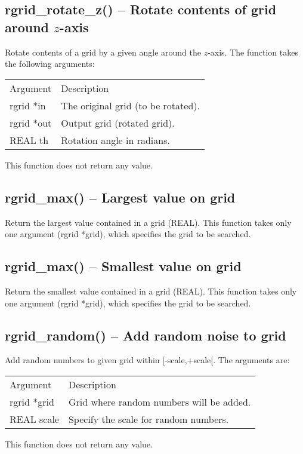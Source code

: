 \documentclass[12pt,letterpaper]{report}
\begin{document}
\subsection{rgrid\_rotate\_z() -- Rotate contents of grid around $z$-axis}

Rotate contents of a grid by a given angle around the $z$-axis. The function takes the following arguments:
\begin{longtable}{p{} p{}}
Argument & Description\\
\cline{1-2}
rgrid *in & The original grid (to be rotated).\\                                                                                
rgrid *out & Output grid (rotated grid).\\
REAL th & Rotation angle in radians.\\
\end{longtable}
\noindent
This function does not return any value. 

\subsection{rgrid\_max() -- Largest value on grid}

Return the largest value contained in a grid (REAL). This function takes only one argument (rgrid *grid), which specifies the grid to be searched.

\subsection{rgrid\_max() -- Smallest value on grid}

Return the smallest value contained in a grid (REAL). This function takes only one argument (rgrid *grid), which specifies the grid to be searched.

\subsection{rgrid\_random() -- Add random noise to grid}

Add random numbers to given grid within [-scale,+scale[. The arguments are:
\begin{longtable}{p{} p{}}
Argument & Description\\
\cline{1-2}
rgrid *grid & Grid where random numbers will be added.\\
REAL scale & Specify the scale for random numbers.\\
\end{longtable}
\noindent
This function does not return any value. 
\end{document}
